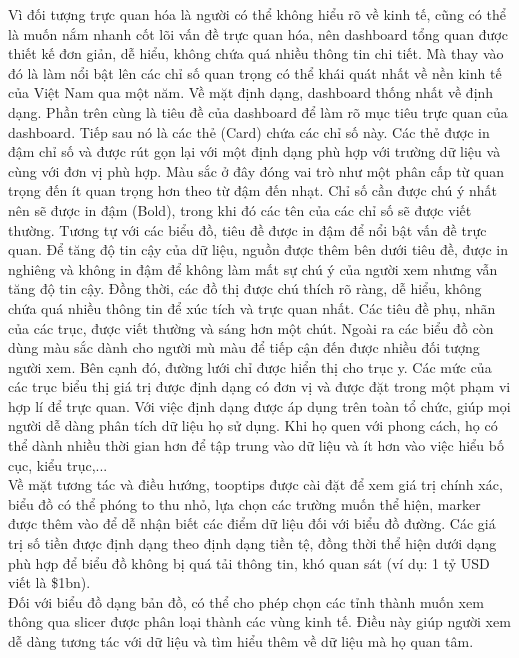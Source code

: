 \documentclass[a4paper]{report}
\begin{document}
{{Vì đối tượng trực quan hóa là người có thể không hiểu rõ về kinh tế, cũng có thể là muốn nắm nhanh cốt lõi vấn đề trực quan hóa, nên dashboard tổng quan được thiết kế đơn giản, dễ hiểu, không chứa quá nhiều thông tin chi tiết. Mà thay vào đó là làm nổi bật lên các chỉ số quan trọng có thể khái quát nhất về nền kinh tế của Việt Nam qua một năm. 
Về mặt định dạng, dashboard thống nhất về định dạng. Phần trên cùng là tiêu đề của dashboard để làm rõ mục tiêu trực quan của dashboard. Tiếp sau nó là các thẻ (Card) chứa các chỉ số này. Các thẻ được in đậm chỉ số và được rút gọn lại với một định dạng phù hợp với trường dữ liệu và cùng với đơn vị phù hợp. Màu sắc ở đây đóng vai trò như một phân cấp từ quan trọng đến ít quan trọng hơn theo từ đậm đến nhạt. Chỉ số cần được chú ý nhất nên sẽ được in đậm (Bold), trong khi đó các tên của các chỉ số sẽ được viết thường. Tương tự với các biểu đồ, tiêu đề được in đậm để nổi bật vấn đề trực quan. Để tăng độ tin cậy của dữ liệu, nguồn được thêm bên dưới tiêu đề, được in nghiêng và không in đậm để không làm mất sự chú ý của người xem nhưng vẫn tăng độ tin cậy. Đồng thời, các đồ thị được chú thích rõ ràng, dễ hiểu, không chứa quá nhiều thông tin để xúc tích và trực quan nhất. Các tiêu đề phụ, nhãn của các trục, được viết thường và sáng hơn một chút.   Ngoài ra các biểu đồ còn dùng màu sắc dành cho người mù màu để tiếp cận đến được nhiều đối tượng người xem. Bên cạnh đó, đường lưới chỉ được hiển thị cho trục y. Các mức của các trục biểu thị giá trị được định dạng có đơn vị và được đặt trong một phạm vi hợp lí để trực quan. Với việc định dạng được áp dụng trên toàn tổ chức, giúp mọi người dễ dàng phân tích dữ liệu họ sử dụng. Khi họ quen với phong cách, họ có thể dành nhiều thời gian hơn để tập trung vào dữ liệu và ít hơn vào việc hiểu bố cục, kiểu trục,...\\

Về mặt tương tác và điều hướng, tooptips được cài đặt để xem giá trị chính xác, biểu đồ có thể phóng to thu nhỏ, lựa chọn các trường muốn thể hiện, marker được thêm vào để dễ nhận biết các điểm dữ liệu đối với biểu đồ đường. 
Các giá trị số tiền được định dạng theo định dạng tiền tệ, đồng thời thể hiện dưới dạng phù hợp để biểu đồ không bị quá tải thông tin, khó quan sát (ví dụ: 1 tỷ USD viết là \$1bn).\\
Đối với biểu đồ dạng bản đồ, có thể cho phép chọn các tỉnh thành muốn xem thông qua slicer được phân loại thành các vùng kinh tế. Điều này giúp người xem dễ dàng tương tác với dữ liệu và tìm hiểu thêm về dữ liệu mà họ quan tâm.\\

}}
\end{document}
